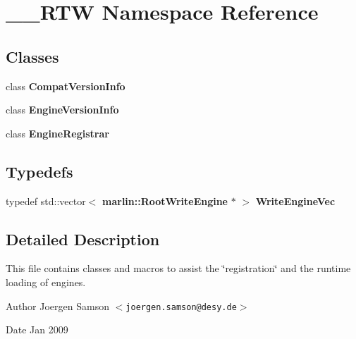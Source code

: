\section{\_\-\_\-RTW Namespace Reference}
\label{namespace____RTW}
\subsection*{Classes}
\begin{DoxyCompactItemize}
\item 
class {\bf CompatVersionInfo}
\item 
class {\bf EngineVersionInfo}
\item 
class {\bf EngineRegistrar}
\end{DoxyCompactItemize}
\subsection*{Typedefs}
\begin{DoxyCompactItemize}
\item 
typedef std::vector$<$ {\bf marlin::RootWriteEngine} $\ast$ $>$ {\bfseries WriteEngineVec}\label{namespace____RTW_a20c9713947b882c127da519485ab5a14}

\end{DoxyCompactItemize}


\subsection{Detailed Description}
This file contains classes and macros to assist the \char`\"{}registration\char`\"{} and the runtime loading of engines. \begin{DoxyAuthor}{Author}
Joergen Samson $<${\tt joergen.samson@desy.de}$>$ 
\end{DoxyAuthor}
\begin{DoxyDate}{Date}
Jan 2009 
\end{DoxyDate}
